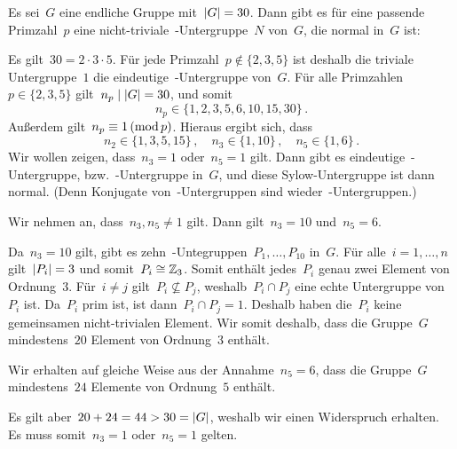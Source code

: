 \begin{example}[Erstklausur 19/20]
  Es sei~$G$ eine endliche Gruppe mit~$\lvert G\rvert = 30$.
  Dann gibt es für eine passende Primzahl~$p$ eine nicht-triviale~-Untergruppe~$N$ von~$G$, die normal in~$G$ ist:

  Es gilt~$30 = 2 \cdot 3 \cdot 5$.
  Für jede Primzahl~$p \notin \{ 2, 3, 5 \}$ ist deshalb die triviale Untergruppe~$1$ die eindeutige~-Untergruppe von~$G$.
  Für alle Primzahlen~$p \in \{2, 3, 5\}$ gilt~$n_p \mid \lvert G\rvert = 30$, und somit
  \[
    n_p \in \{ 1, 2, 3, 5, 6, 10, 15, 30 \} \,.
  \]
  Außerdem gilt~$n_p \equiv 1 \,(\operatorname{mod} p)$.
  Hieraus ergibt sich, dass
  \[
    n_2 \in \{ 1, 3, 5, 15 \} \,,
    \quad
    n_3 \in \{ 1, 10 \} \,,
    \quad
    n_5 \in \{ 1, 6 \} \,.
  \]
  Wir wollen zeigen, dass~$n_3 = 1$ oder~$n_5 = 1$ gilt.
  Dann gibt es eindeutige~-Untergruppe, bzw.~-Untergruppe in~$G$, und diese Sylow-Untergruppe ist dann normal.
  (Denn Konjugate von~-Untergruppen sind wieder~-Untergruppen.)
  
  Wir nehmen an, dass~$n_3, n_5 \neq 1$ gilt.
  Dann gilt~$n_3 = 10$ und~$n_5 = 6$.

  Da~$n_3 = 10$ gilt, gibt es zehn~-Untegruppen~$P_1, \dotsc, P_{10}$ in~$G$.
  Für alle~$i = 1, \dotsc, n$ gilt~$\lvert P_i\rvert = 3$ und somit~$P_i \cong \mathbb{Z}_3$.
  Somit enthält jedes~$P_i$ genau zwei Element von Ordnung~$3$.
  Für~$i \neq j$ gilt~$P_i \nsubseteq P_j$, weshalb~$P_i \cap P_j$ eine echte Untergruppe von~$P_i$ ist.
  Da~$P_i$ prim ist, ist dann~$P_i \cap P_j = 1$.
  Deshalb haben die~$P_i$ keine gemeinsamen nicht-trivialen Element.
  Wir somit deshalb, dass die Gruppe~$G$ mindestens~$20$ Element von Ordnung~$3$ enthält.

  Wir erhalten auf gleiche Weise aus der Annahme~$n_5 = 6$, dass die Gruppe~$G$ mindestens~$24$ Elemente von Ordnung~$5$ enthält.

  Es gilt aber~$20 + 24 = 44 > 30 = \lvert G\rvert$, weshalb wir einen Widerspruch erhalten.
  Es muss somit~$n_3 = 1$ oder~$n_5 = 1$ gelten.

\end{example}


